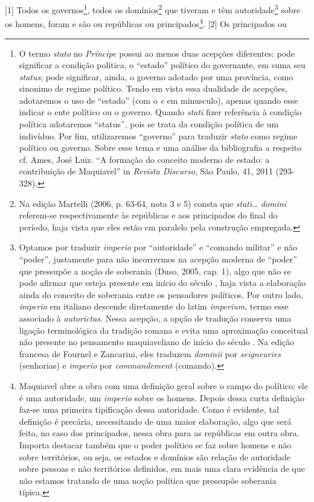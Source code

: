 {[}1{]} Todos os governos\footnote{O termo \emph{stato} no
  \emph{Príncipe} possui ao menos duas acepções diferentes: pode
  significar a condição política, o ``estado'' político do governante,
  em suma seu \emph{status}; pode significar, ainda, o governo adotado
  por uma província, como sinonimo de regime político. Tendo em vista
  essa dualidade de acepções, adotaremos o uso de ``estado'' (com o
  \emph{e} em minusculo), apenas quando esse indicar o ente político ou
  o governo. Quando \emph{stati} fizer referência à condição política
  adotaremos ``status'', pois se trata da condição política de um
  indivíduo. Por fim, utilizaremos ``governo'' para traduzir
  \emph{stato} como regime político ou governo. Sobre esse tema e uma
  análise da bibliografia a respeito cf. Ames, José Luiz. ``A formação
  do conceito moderno de estado: a contribuição de Maquiavel'' in
  \emph{Revista Discurso}, São Paulo, 41, 2011 (293-328).}, todos os
domínios\footnote{Na edição Martelli (2006, p. 63-64, nota 3 e 5) consta
  que \emph{stati\ldots{} domini} referem-se respectivamente às repúblicas e
  aos principados do final do período, haja vista que eles estão em
  paralelo pela construção empregada.} que tiveram e têm
autoridade\footnote{Optamos por traduzir \emph{imperio} por
  ``autoridade'' e ``comando militar'' e não ``poder'', justamente para
  não incorrermos na acepção moderna de ``poder'' que pressupõe a noção
  de soberania (Duso, 2005, cap. 1), algo que não se pode afirmar que
  esteja presente em início do século , haja vista a elaboração ainda
  do conceito de soberania entre os pensadores políticos. Por outro
  lado, \emph{imperio} em italiano descende diretamente do latim
  \emph{imperium}, termo esse associado à \emph{autorictas}. Nessa
  acepção, a opção de tradução conserva uma ligação terminológica da
  tradição romana e evita uma aproximação conceitual não presente no
  pensamento maquiaveliano de início do século . Na edição francesa
  de Fournel e Zancarini, eles traduzem \emph{dominii} por
  \emph{seigneuries} (senhorias) e \emph{imperio} por
  \emph{commandement} (comando).} sobre os homens, foram e são ou
repúblicas ou principados\footnote{Maquiavel abre a obra com uma
  definição geral sobre o campo do político: ele é uma autoridade, um
  \emph{imperio} sobre os homens. Depois dessa curta definição faz-se
  uma primeira tipificação dessa autoridade. Como é evidente, tal
  definição é precária, necessitando de uma maior elaboração, algo que
  será feito, no caso dos principados, nessa obra para as repúblicas em
  outra obra. Importa destacar também que o poder político se faz sobre
  homens e não sobre territórios, ou seja, os estados e domínios são
  relação de autoridade sobre pessoas e não territórios definidos, em
  mais uma clara evidência de que não estamos tratando de uma noção
  política que pressupõe soberania típica.}. {[}2{]} Os principados ou
